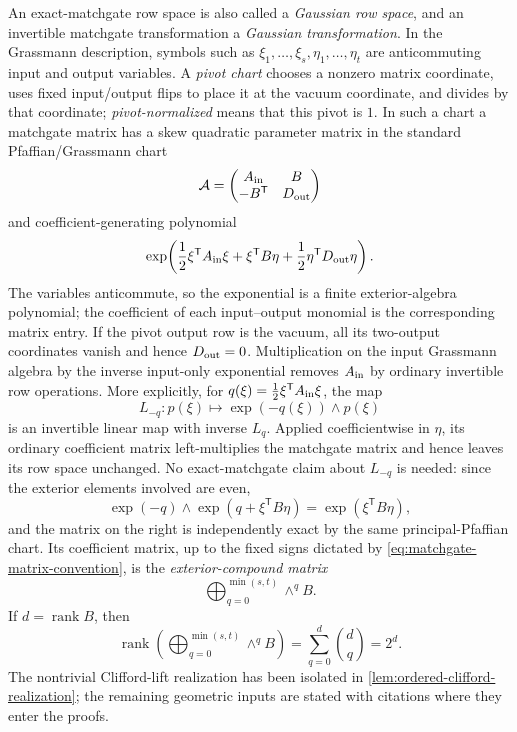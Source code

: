 \documentclass[11pt]{article}
\theoremstyle{definition}
\theoremstyle{remark}
\newcommand{\trans}{\mathsf T}
\newcommand{\rank}{\operatorname{rank}}
\begin{document}
An exact-matchgate row space is also called a \emph{Gaussian row space},
and an invertible matchgate transformation a \emph{Gaussian
transformation}.  In the Grassmann description, symbols such as
$\xi_1,\ldots,\xi_s,\eta_1,\ldots,\eta_t$ are anticommuting input and output
variables.  A \emph{pivot chart} chooses a nonzero matrix coordinate, uses
fixed input/output flips to place it at the vacuum coordinate, and divides
by that coordinate; \emph{pivot-normalized} means that this pivot is $1$.
In such a chart a matchgate matrix has a skew quadratic
parameter matrix in the standard Pfaffian/Grassmann chart
\cite{CaiChoudharyLu2009,Xia2016}
\[
  \mathcal A=
  \begin{pmatrix}A_{\rm in}&B\\-B^{\trans}&D_{\rm out}\end{pmatrix}
\]
and coefficient-generating polynomial
\[
  \exp\!\left(\frac12\xi^{\trans}A_{\rm in}\xi
    +\xi^{\trans}B\eta
    +\frac12\eta^{\trans}D_{\rm out}\eta\right).
\]
The variables anticommute, so the exponential is a finite exterior-algebra
polynomial; the coefficient of each input--output monomial is the
corresponding matrix entry.  If the pivot output row is the vacuum, all its
two-output coordinates vanish and hence $D_{\rm out}=0$.  Multiplication on
the input Grassmann algebra by the inverse input-only exponential removes
$A_{\rm in}$ by ordinary invertible row operations.  More explicitly, for
$q(\xi)=\frac12\xi^{\trans}A_{\rm in}\xi$, the map
\[
  L_{-q}:p(\xi)\longmapsto \exp(-q(\xi))\wedge p(\xi)
\]
is an invertible linear map with inverse $L_q$.  Applied coefficientwise in
$\eta$, its ordinary coefficient matrix left-multiplies the matchgate
matrix and hence leaves its row space unchanged.  No exact-matchgate claim
about $L_{-q}$ is needed: since the exterior elements involved are even,
\[
  \exp(-q)\wedge\exp(q+\xi^{\trans}B\eta)
  =\exp(\xi^{\trans}B\eta),
\]
and the matrix on the right is independently exact by the same
principal-Pfaffian chart.  Its coefficient matrix, up to the fixed signs
dictated by \eqref{eq:matchgate-matrix-convention}, is the
\emph{exterior-compound matrix}
\[
  \bigoplus_{q=0}^{\min(s,t)}\wedge^qB.
\]
If
$d=\rank B$, then
\begin{equation}
  \rank\!\left(\bigoplus_{q=0}^{\min(s,t)}\wedge^qB\right)
  =\sum_{q=0}^{d}\binom dq=2^d.
  \label{eq:exterior-compound-rank}
\end{equation}
The nontrivial Clifford-lift realization has been isolated in
\cref{lem:ordered-clifford-realization}; the remaining geometric inputs are
stated with citations where they enter the proofs.
\end{document}
